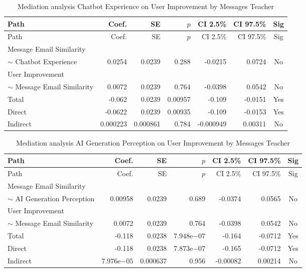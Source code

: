 \begin{longtable}{lrrrrrc}
            \caption{Mediation analysis Chatbot Experience on User Improvement by  Messages Teacher}\label{tab:mediation Chatbot Experience on User Improvement by  Messages Teacher}\\
            \toprule
            Path & Coef. & SE & $p$ & CI 2.5\% & CI 97.5\% & Sig \\
            \midrule
            \endfirsthead
            \toprule
            Path & Coef. & SE & $p$ & CI 2.5\% & CI 97.5\% & Sig \\
            \midrule
            \endhead
            \bottomrule
            \endfoot
            Message Email Similarity\\ $\sim$ Chatbot Experience & 0.0254 & 0.0239 & 0.288 & -0.0215 & 0.0724 & No \\
User Improvement\\ $\sim$ Message Email Similarity & 0.0072 & 0.0239 & 0.764 & -0.0398 & 0.0542 & No \\
Total & -0.062 & 0.0239 & 0.00957 & -0.109 & -0.0151 & Yes \\
Direct & -0.0622 & 0.0239 & 0.00935 & -0.109 & -0.0153 & Yes \\
Indirect & 0.000223 & 0.000861 & 0.784 & -0.000949 & 0.00311 & No \\
\end{longtable}

\begin{longtable}{lrrrrrc}
            \caption{Mediation analysis AI Generation Perception on User Improvement by  Messages Teacher}\label{tab:mediation AI Generation Perception on User Improvement by  Messages Teacher}\\
            \toprule
            Path & Coef. & SE & $p$ & CI 2.5\% & CI 97.5\% & Sig \\
            \midrule
            \endfirsthead
            \toprule
            Path & Coef. & SE & $p$ & CI 2.5\% & CI 97.5\% & Sig \\
            \midrule
            \endhead
            \bottomrule
            \endfoot
            Message Email Similarity\\ $\sim$ AI Generation Perception & 0.00958 & 0.0239 & 0.689 & -0.0374 & 0.0565 & No \\
User Improvement\\ $\sim$ Message Email Similarity & 0.0072 & 0.0239 & 0.764 & -0.0398 & 0.0542 & No \\
Total & -0.118 & 0.0238 & $7.948\mathrm{e}{-07}$ & -0.164 & -0.0712 & Yes \\
Direct & -0.118 & 0.0238 & $7.873\mathrm{e}{-07}$ & -0.165 & -0.0712 & Yes \\
Indirect & $7.976\mathrm{e}{-05}$ & 0.000637 & 0.956 & -0.00082 & 0.00214 & No \\
\end{longtable}

